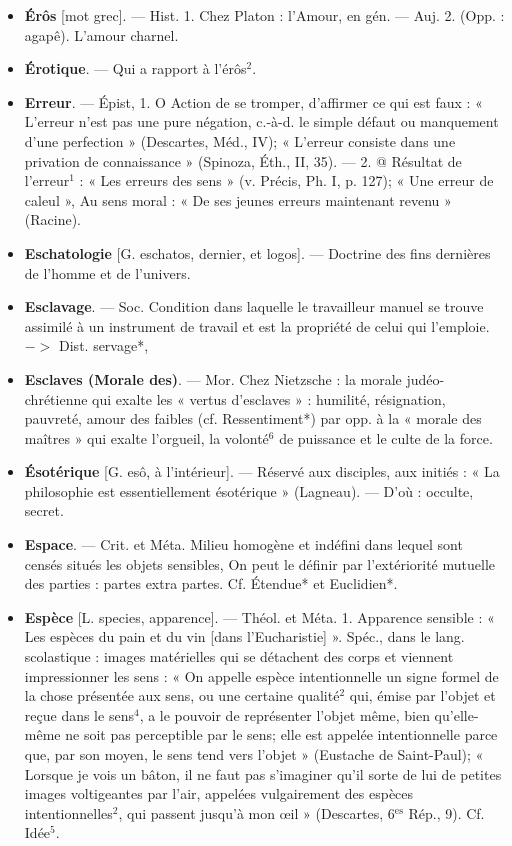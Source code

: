 \begin{itemize}[leftmargin=1cm, label=, itemsep=1pt]
\item {\bf Érôs} [mot grec]. — Hist. 1. Chez
Platon : l'Amour, en gén. — Auj.
2. (Opp. : agapê). L'amour charnel.

\item {\bf Érotique}. — Qui a rapport à l’érôs$^2$.

\item {\bf Erreur}. — Épist, 1. O Action de se
tromper, d'affirmer ce qui est faux :
« L'erreur n’est pas une pure négation, c.-à-d. le simple défaut ou
manquement d'une perfection »
(Descartes, Méd., IV); « L'erreur
consiste dans une privation de connaissance » (Spinoza, Éth., II, 35).
— 2. @ Résultat de l'erreur$^1$ : « Les
erreurs des sens » (v. Précis, Ph. I,
p. 127); « Une erreur de caleul », Au
sens moral : « De ses jeunes erreurs
maintenant revenu » (Racine).

\item {\bf Eschatologie} [G. eschatos, dernier, et
logos]. — Doctrine des fins dernières de l’homme et de l'univers.

\item {\bf Esclavage}. — Soc. Condition dans laquelle le travailleur manuel se
trouve assimilé à un instrument de
travail et est la propriété de celui
qui l'emploie. $->$ Dist. servage*,

\item {\bf Esclaves (Morale des)}. — Mor. Chez
Nietzsche : la morale judéo-chrétienne qui exalte les « vertus d’esclaves » : humilité, résignation, pauvreté, amour des faibles (cf. Ressentiment*) par opp. à la « morale des
maîtres » qui exalte l’orgueil, la
volonté$^6$ de puissance et le culte de
la force.

\item {\bf Ésotérique} [G. esô, à l'intérieur]. —
Réservé aux disciples, aux initiés :
« La philosophie est essentiellement
ésotérique » (Lagneau). — D'où :
occulte, secret.

\item {\bf Espace}. — Crit. et Méta. Milieu homogène et indéfini dans lequel sont
censés situés les objets sensibles, On
peut le définir par l’extériorité mutuelle des parties : partes extra partes. Cf. Étendue* et Euclidien*.

\item {\bf Espèce} [L. species, apparence]. —
Théol. et Méta. 1. Apparence sensible : « Les espèces du pain et du
vin [dans l’Eucharistie] ». Spéc.,
dans le lang. scolastique : images
matérielles qui se détachent des
corps et viennent impressionner les
sens : « On appelle espèce intentionnelle un signe formel de la chose
présentée aux sens, ou une certaine
qualité$^2$ qui, émise par l'objet et
reçue dans le sens$^4$, a le pouvoir de
représenter l’objet même, bien
qu'elle-même ne soit pas perceptible par le sens; elle est appelée
intentionnelle parce que, par son
moyen, le sens tend vers l’objet »
(Eustache de Saint-Paul); « Lorsque
je vois un bâton, il ne faut pas
s’imaginer qu'il sorte de lui de petites images voltigeantes par l’air,
appelées vulgairement des espèces
intentionnelles$^2$, qui passent jusqu’à
mon œil » (Descartes, 6$^\text{es}$ Rép., 9).
Cf. Idée$^5$.


\end{itemize}
